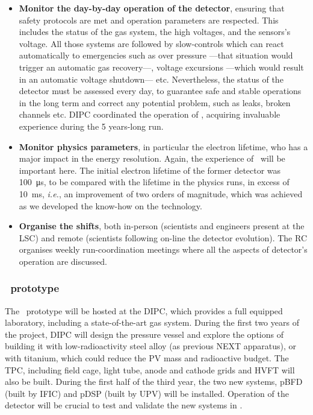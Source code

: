 \begin{itemize}[noitemsep,topsep=0pt,parsep=0pt,partopsep=0pt]
\item {\bf Monitor the day-by-day operation of the detector}, ensuring that safety protocols are met and operation parameters are respected. This includes the status of the gas system, the high voltages, and the sensors's voltage. All those systems are followed by slow-controls which can react automatically to emergencies such as over pressure ---that situation would trigger an automatic gas recovery---, voltage excursions ---which would result in an automatic voltage shutdown--- etc. Nevertheless, the status of the detector must be assessed every day, to guarantee safe and stable operations in the long term and correct any potential problem, such as leaks, broken channels etc. DIPC coordinated the operation of \NEW, acquiring invaluable experience during the 5 years-long run. 
 
\item {\bf Monitor physics parameters},  in particular the electron lifetime, who has a major impact in the energy resolution. Again, the experience of \NEW\ will be important here. The initial electron lifetime of the former detector was \SI{100}{\micro\second}, to be compared with the lifetime in the physics runs, in excess of 
\SI{10}{\milli\second}, \emph{i.e.}, an improvement of two orders of magnitude, which was achieved as we developed the know-how on the technology. 

\item {\bf Organise the shifts}, both in-person (scientists and engineers present at the LSC) and remote (scientists following on-line the detector evolution). The RC organises weekly run-coordination meetings where all the aspects of detector's operation are discussed. 
\end{itemize}

\indent

\subsubsection*{\HDEMO\ prototype}

\indent

The \HDEMO\ prototype will be hosted at the DIPC, which provides a full equipped laboratory, including a state-of-the-art gas system.  During the first two years of the project, DIPC will design the pressure vessel and explore the options of building it with low-radioactivity steel alloy (as previous NEXT apparatus), or with titanium, which could reduce the PV mass and radioactive budget. The TPC, including field cage, light tube, anode and cathode grids and HVFT will also be built.  During the first half of the third year, the two new systems, pBFD (built by IFIC) and pDSP (built by UPV) will be installed. Operation of the detector will be crucial to test and validate the new systems in \NHD. 

